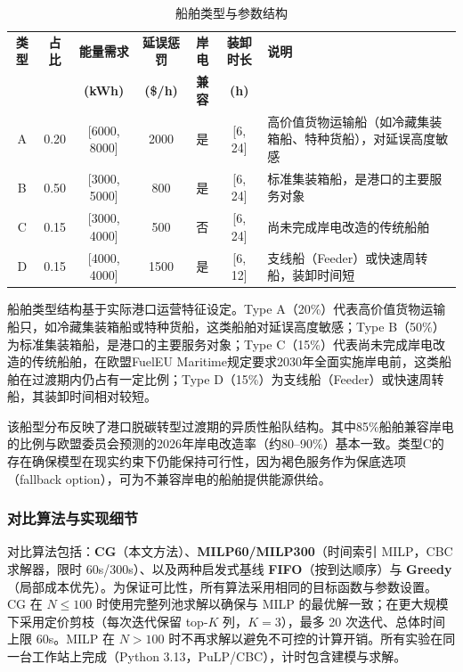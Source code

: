 \documentclass[UTF8, a4paper, 12pt]{ctexart}
\begin{document}
\begin{table}[htbp]
    \centering
    \caption{船舶类型与参数结构}
    \label{tab:ship_types}
    \footnotesize
    \renewcommand{\arraystretch}{1.3}
    \begin{threeparttable}
    \begin{tabular}{c c c c c c p{4cm}}
        \toprule
        \textbf{类型} & \textbf{占比} & \textbf{能量需求} & \textbf{延误惩罚} & \textbf{岸电} & \textbf{装卸时长} & \textbf{说明} \\
        & & \textbf{(kWh)} & \textbf{(\$/h)} & \textbf{兼容} & \textbf{(h)} & \\
        \midrule
        A & 0.20 & [6000, 8000] & 2000 & 是 & [6, 24] & 高价值货物运输船（如冷藏集装箱船、特种货船），对延误高度敏感 \\
        \addlinespace
        B & 0.50 & [3000, 5000] & 800 & 是 & [6, 24] & 标准集装箱船，是港口的主要服务对象 \\
        \addlinespace
        C & 0.15 & [3000, 4000] & 500 & 否 & [6, 24] & 尚未完成岸电改造的传统船舶 \\
        \addlinespace
        D & 0.15 & [4000, 4000] & 1500 & 是 & [6, 12] & 支线船（Feeder）或快速周转船，装卸时间短 \\
        \bottomrule
    \end{tabular}
    \end{threeparttable}
\end{table}

船舶类型结构基于实际港口运营特征设定。Type A（20\%）代表高价值货物运输船只，如冷藏集装箱船或特种货船，这类船舶对延误高度敏感；Type B（50\%）为标准集装箱船，是港口的主要服务对象；Type C（15\%）代表尚未完成岸电改造的传统船舶，在欧盟FuelEU Maritime规定\cite{EU2025}要求2030年全面实施岸电前，这类船舶在过渡期内仍占有一定比例；Type D（15\%）为支线船（Feeder）或快速周转船，其装卸时间相对较短。

该船型分布反映了港口脱碳转型过渡期的异质性船队结构。其中85\%船舶兼容岸电的比例与欧盟委员会预测的2026年岸电改造率（约80--90\%）基本一致。类型C的存在确保模型在现实约束下仍能保持可行性，因为褐色服务作为保底选项（fallback option），可为不兼容岸电的船舶提供能源供给。

\subsubsection{对比算法与实现细节}
\label{sec:baselines_impl}
对比算法包括：\textbf{CG}（本文方法）、\textbf{MILP60/MILP300}（时间索引 MILP，CBC 求解器，限时 60s/300s）、以及两种启发式基线 \textbf{FIFO}（按到达顺序）与 \textbf{Greedy}（局部成本优先）。为保证可比性，所有算法采用相同的目标函数与参数设置。CG 在 $N\le 100$ 时使用完整列池求解以确保与 MILP 的最优解一致；在更大规模下采用定价剪枝（每次迭代保留 top-$K$ 列，$K=3$），最多 20 次迭代、总体时间上限 60s。MILP 在 $N>100$ 时不再求解以避免不可控的计算开销。所有实验在同一台工作站上完成（Python 3.13，PuLP/CBC），计时包含建模与求解。
\end{document}

